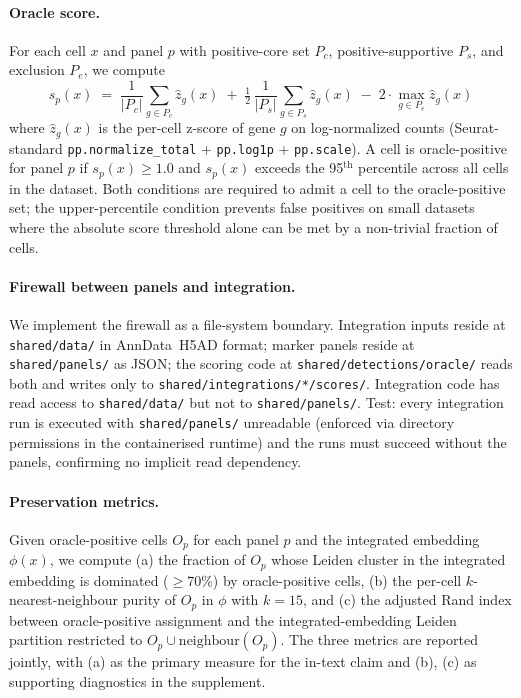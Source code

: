 \paragraph*{Oracle score.}
For each cell $x$ and panel $p$ with positive-core set $P_c$,
positive-supportive $P_s$, and exclusion $P_e$, we compute
\begin{equation}
  s_p(x) \;=\; \frac{1}{|P_c|} \sum_{g \in P_c} \hat{z}_g(x)
  \;+\; \tfrac{1}{2}\, \frac{1}{|P_s|} \sum_{g \in P_s} \hat{z}_g(x)
  \;-\; 2 \cdot \max_{g \in P_e} \hat{z}_g(x)
  \label{eq:oracle-score}
\end{equation}
where $\hat{z}_g(x)$ is the per-cell z-score of gene $g$ on log-normalized
counts (Seurat-standard \verb|pp.normalize_total| + \verb|pp.log1p| + \verb|pp.scale|).
A cell is oracle-positive for panel $p$ if $s_p(x) \geq 1.0$ and $s_p(x)$
exceeds the 95$^\mathrm{th}$ percentile across all cells in the dataset.
Both conditions are required to admit a cell to the oracle-positive set;
the upper-percentile condition prevents false positives on small datasets
where the absolute score threshold alone can be met by a non-trivial
fraction of cells.

\paragraph*{Firewall between panels and integration.}
We implement the firewall as a file-system boundary. Integration inputs
reside at \verb|shared/data/| in AnnData~H5AD format; marker panels
reside at \verb|shared/panels/| as JSON; the scoring code at
\verb|shared/detections/oracle/| reads both and writes only to
\verb|shared/integrations/*/scores/|. Integration code has read access
to \verb|shared/data/| but not to \verb|shared/panels/|. Test: every
integration run is executed with \verb|shared/panels/| unreadable
(enforced via directory permissions in the containerised runtime) and
the runs must succeed without the panels, confirming no implicit read
dependency.

\paragraph*{Preservation metrics.}
Given oracle-positive cells $O_p$ for each panel $p$ and the integrated
embedding $\phi(x)$, we compute (a) the fraction of $O_p$ whose Leiden
cluster in the integrated embedding is dominated ($\geq 70\%$) by
oracle-positive cells, (b) the per-cell $k$-nearest-neighbour purity of
$O_p$ in $\phi$ with $k=15$, and (c) the adjusted Rand index between
oracle-positive assignment and the integrated-embedding Leiden
partition restricted to $O_p \cup \mathrm{neighbour}(O_p)$. The three
metrics are reported jointly, with (a) as the primary measure for the
in-text claim and (b), (c) as supporting diagnostics in the supplement.

